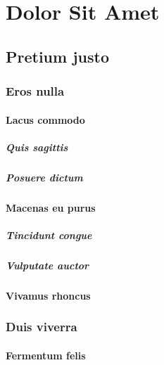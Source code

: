 \renewcommand*{\hbPartCover}{assets/samples/part-cover}
\part{Dolor Sit Amet}

\chapter{Pretium justo}

 \lipsum[1-2]

\section{Eros nulla} \lipsum[3-4]
\subsection{Lacus commodo} \lipsum[5]
\subsubsection{Quis sagittis} \lipsum[6]
\subsubsection{Posuere dictum} \lipsum[7]
\subsection{Macenas eu purus} \lipsum[8]
\subsubsection{Tincidunt congue} \lipsum[9]
\subsubsection{Vulputate auctor} \lipsum[10]
\subsection{Vivamus rhoncus} \lipsum[11-12]

\section{Duis viverra} \lipsum[13-14]
\subsection{Fermentum felis} \lipsum[15]
